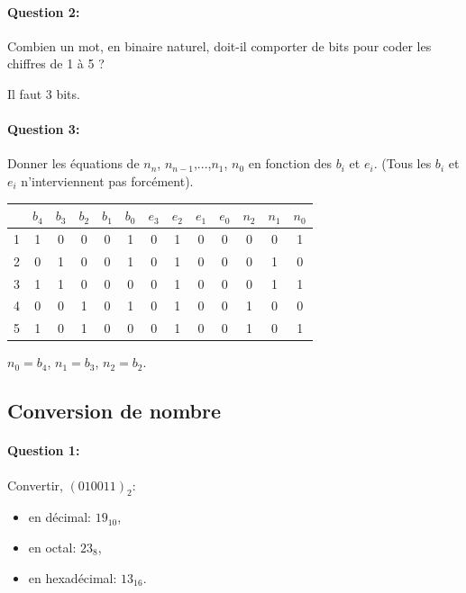 \paragraph{Question 2:} Combien un mot, en binaire naturel, doit-il comporter de bits pour coder les chiffres de 1 à 5 ? 

Il faut 3 bits.

\paragraph{Question 3:} Donner les équations de $n_n$, $n_{n-1}$,...,$n_1$, $n_0$ en fonction des $b_i$ et $e_i$. (Tous les $b_i$ et $e_i$ n'interviennent pas forcément). 

\begin{center}
\begin{tabular}{|c|c|c|c|c|c|c|c|c|c||c|c|c|}
\hline
 & $b_4$ & $b_3$ & $b_2$ & $b_1$ & $b_0$ & $e_3$ & $e_2$ & $e_1$ & $e_0$ & $n_2$ & $n_1$ & $n_0$ \\
\hline
1 & 1 & 0 & 0 & 0 & 1 & 0 & 1 & 0 & 0 & 0 & 0 & 1\\
\hline
2 & 0 & 1 & 0 & 0 & 1 & 0 & 1 & 0 & 0 & 0 & 1 & 0\\
\hline
3 & 1 & 1 & 0 & 0 & 0 & 0 & 1 & 0 & 0 & 0 & 1 & 1\\
\hline
4 & 0 & 0 & 1 & 0 & 1 & 0 & 1 & 0 & 0 & 1 & 0 & 0\\
\hline
5 & 1 & 0 & 1 & 0 & 0 & 0 & 1 & 0 & 0 & 1 & 0 & 1 \\
\hline
\end{tabular}
\end{center}

$n_0=b_4$, $n_1=b_3$, $n_2=b_2$.

\subsection{Conversion de nombre}

\paragraph{Question 1:}

Convertir, $(010011)_{2}$:
\begin{itemize}
 \item en décimal: $19_{10}$,
 \item en octal: $23_{8}$,
 \item en hexadécimal: $13_{16}$.
\end{itemize}

